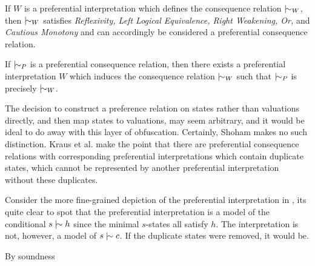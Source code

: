 \begin{theorem}[Soundness]
	\label{theorem:soundness-preferential}

	If $W$ is a preferential interpretation which defines the consequence relation $\twiddle_{W}$, then $\twiddle_{W}$ satisfies
	\textit{Reflexivity, Left Logical Equivalence, Right Weakening, Or,} and \textit{Cautious Monotony} and can accordingly
	be considered a preferential consequence relation.
\end{theorem}

\begin{theorem}[Completeness]
	\label{theorem:completeness-preferential}

	If $\twiddle_{P}$ is a preferential consequence relation, then there exists a preferential interpretation $W$ which induces
	the consequence relation $\twiddle_{W}$ such that $\twiddle_{P}$ is precisely $\twiddle_{W}$.
\end{theorem}

The decision to construct a preference relation on states rather than valuations directly, and then map states to valuations,
may seem arbitrary, and it would be ideal to do away with this layer of obfuscation. Certainly, Shoham \cite{shohamSemanticApproach}
makes no such distinction. Kraus et al. \cite{kraus1990nonmonotonic} make the point that there are preferential consequence
relations with corresponding preferential interpretations which contain duplicate states, which cannot be represented by
another preferential interpretation without these duplicates.

\begin{example}
	Consider the more fine-grained depiction of the preferential interpretation in ,
	its quite clear to spot that the preferential interpretation is a model of the conditional $s \twiddle h$ since the
	minimal $s$-states all satisfy $h$. The interpretation is not, however, a model of $s \twiddle c$. If the duplicate
	states were removed, it would be.
	\begin{figure}
		\centering
	\end{figure}
	By soundness
\end{example}

